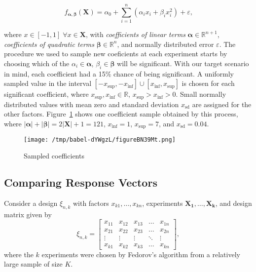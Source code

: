 \documentclass[11pt]{article}
\begin{document}
\[
f_{\boldsymbol{\alpha},\boldsymbol{\beta}}(\mathbf{X}) = \alpha_0 + \sum\limits^{n}_{i = 1}{\left(\alpha_{i}x_{i} + \beta_{i}x_{i}^{2}\right)} + \varepsilon\text{,}
\]

where \(x \in [-1, 1] \; \forall x \in \mathbf{X}\), with \emph{coefficients of linear
terms} \(\boldsymbol{\alpha} \in \mathbb{R}^{n + 1}\), \emph{coefficients of quadratic
terms} \(\boldsymbol{\beta} \in \mathbb{R}^{n}\), and normally distributed error
\(\varepsilon\). The procedure we used to sample new coeficients at each
experiment starts by choosing which of the \(\alpha_i \in \boldsymbol{\alpha}\),
\(\beta_i \in \boldsymbol{\beta}\) will be significant. With our target scenario
in mind, each coefficient had a 15\% chance of being significant. A uniformly
sampled value in the interval \([-x_{\text{sup}}, -x_{\text{inf}}] \cup
[x_{\text{inf}}, x_{\text{sup}}]\) is chosen for each significant coefficient,
where \(x_{\text{sup}},x_{\text{inf}} \in \mathbb{R}\),
\(x_{\text{sup}}>x_{\text{inf}}>0\). Small normally distributed values with mean
zero and standard deviation \(x_{\text{sd}}\) are assigned for the other factors.
Figure~\ref{fig:org5d0da57} shows one coefficient sample obtained by this
process, where \(|\boldsymbol{\alpha}| + |\boldsymbol{\beta}| =
2|\boldsymbol{X}| + 1 = 121\), \(x_{\text{inf}} = 1\), \(x_{\text{sup}} = 7\), and
\(x_{\text{sd}} = 0.04\).

\begin{figure}[htbp]
\centering
\texttt{[image: /tmp/babel-dYWgzL/figureBN39Mt.png]}
\caption{\label{fig:org5d0da57}
Sampled coefficients}
\end{figure}

\subsection{Comparing Response Vectors}
\label{sec:org0e25809}
Consider a design \(\xi_{n,k}\) with factors \(x_{k1},\dots,x_{kn}\), experiments
\(\boldsymbol{X_1}, \dots, \boldsymbol{X_k}\), and design matrix given by
\[
\xi_{n,k} =
\begin{bmatrix}
    x_{11} & x_{12} & x_{13} & \dots  & x_{1n} \\
    x_{21} & x_{22} & x_{23} & \dots  & x_{2n} \\
    \vdots & \vdots & \vdots & \ddots & \vdots \\
    x_{k1} & x_{k2} & x_{k3} & \dots  & x_{kn}
\end{bmatrix},
\]
where the \(k\) experiments were chosen by Fedorov's algorithm from a relatively
large sample of size \(K\).
\end{document}
